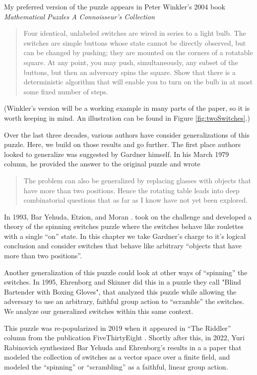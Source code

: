 My preferred version of the puzzle appears in Peter Winkler's 2004 book
\textit{Mathematical Puzzles A Connoisseur's Collection}
\begin{quote}
  Four identical, unlabeled switches are wired in series to a light bulb.
  The switches are simple buttons whose state cannot be directly observed,
  but can be changed by pushing; they are mounted on the corners of a
  rotatable square. At any point, you may push, simultaneously, any subset
  of the buttons, but then an adversary spins the square. Show that there
  is a deterministic algorithm that will enable you to turn on the bulb in
  at most some fixed number of steps. \cite{Winkler2004}
\end{quote}

(Winkler's version will be a working example in many parts of the paper, so it
is worth keeping in mind.
An illustration can be found in Figure \ref{fig:twoSwitches}.)

Over the last three decades, various authors have consider generalizations of
this puzzle. Here, we build on those results and go further.
The first place authors looked to generalize was suggested by Gardner himself.
In his March 1979 column, he provided the answer to the original puzzle and wrote
\begin{quote}
The problem can also be generalized by replacing glasses with objects that
have more than two positions. Hence the rotating table leads into deep
combinatorial questions that as far as I know have not yet been explored.
\cite{Gardner1979Solution}
\end{quote}

In 1993, Bar Yehuda, Etzion, and Moran \cite{BarYehuda1993}. took on the challenge and developed a theory
of the spinning switches puzzle where the switches behave like roulettes
with a single ``on'' state. In this chapter we take Gardner's charge to
it's logical conclusion and consider switches that behave like arbitrary
``objects that have more than two positions''.

Another generalization of this puzzle could look at other ways of ``spinning''
the switches. In 1995, Ehrenborg and Skinner \cite{Ehrenborg1995} did this
in a puzzle they call "Blind Bartender with Boxing Gloves", that analyzed
this puzzle while allowing the adversary to use an arbitrary, faithful group action
to ``scramble'' the switches. We analyze our generalized switches within this
same context.

This puzzle was re-popularized in 2019 when it appeared in ``The Riddler''
column from the publication FiveThirtyEight \cite{FiveThirtyEight}.
Shortly after this, in 2022, Yuri Rabinovich synthesized Bar Yehuda and Ehrenborg's
results in a a paper that modeled the collection of switches as a vector space
over a finite field, and modeled the ``spinning'' or ``scrambling'' as a
faithful, linear group action.

